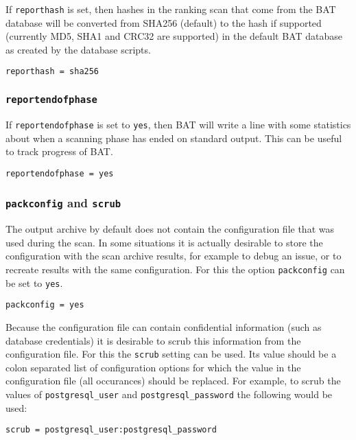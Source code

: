 \documentclass[10pt,a4paper]{article}
\begin{document}
If \texttt{reporthash} is set, then hashes in the ranking scan that come from
the BAT database will be converted from SHA256 (default) to the hash if
supported (currently MD5, SHA1 and CRC32 are supported) in the default BAT
database as created by the database scripts.

\begin{verbatim}
reporthash = sha256
\end{verbatim}

\subsubsection{\texttt{reportendofphase}}

If \texttt{reportendofphase} is set to \texttt{yes}, then BAT will write a
line with some statistics about when a scanning phase has ended on standard
output. This can be useful to track progress of BAT.

\begin{verbatim}
reportendofphase = yes
\end{verbatim}

\subsubsection{\texttt{packconfig} and \texttt{scrub}}

The output archive by default does not contain the configuration file that was
used during the scan. In some situations it is actually desirable to store the
configuration with the scan archive results, for example to debug an issue, or
to recreate results with the same configuration. For this the option
\texttt{packconfig} can be set to \texttt{yes}.

\begin{verbatim}
packconfig = yes
\end{verbatim}

Because the configuration file can contain confidential information (such as
database credentials) it is desirable to scrub this information from the
configuration file. For this the \texttt{scrub} setting can be used. Its value
should be a colon separated list of configuration options for which the value
in the configuration file (all occurances) should be replaced. For example, to
scrub the values of \texttt{postgresql\_user} and \texttt{postgresql\_password}
the following would be used:

\begin{verbatim}
scrub = postgresql_user:postgresql_password
\end{verbatim}
\end{document}
